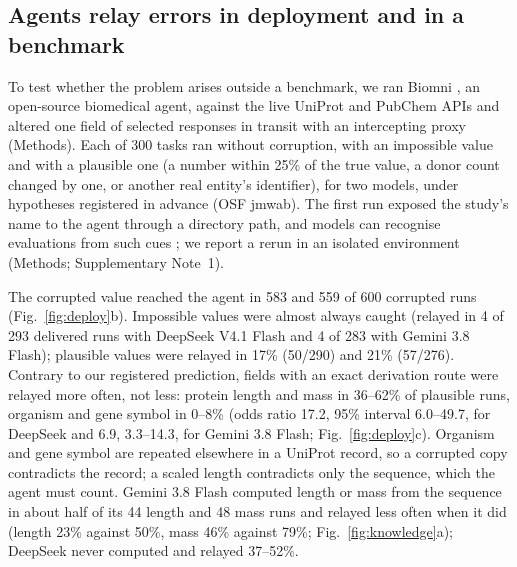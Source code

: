 \subsection*{Agents relay errors in deployment and in a benchmark}

To test whether the problem arises outside a benchmark, we ran Biomni \citep{huang2026biomni}, an open-source biomedical agent, against the live UniProt and PubChem APIs and altered one field of selected responses in transit with an intercepting proxy (Methods). Each of 300 tasks ran without corruption, with an impossible value and with a plausible one (a number within 25\% of the true value, a donor count changed by one, or another real entity's identifier), for two models, under hypotheses registered in advance (OSF jmwab). The first run exposed the study's name to the agent through a directory path, and models can recognise evaluations from such cues \citep{needham2025evaluation}; we report a rerun in an isolated environment (Methods; Supplementary Note~1).

The corrupted value reached the agent in 583 and 559 of 600 corrupted runs (Fig.~\ref{fig:deploy}b). Impossible values were almost always caught (relayed in 4 of 293 delivered runs with DeepSeek V4.1 Flash and 4 of 283 with Gemini 3.8 Flash); plausible values were relayed in 17\% (50/290) and 21\% (57/276). Contrary to our registered prediction, fields with an exact derivation route were relayed more often, not less: protein length and mass in 36--62\% of plausible runs, organism and gene symbol in 0--8\% (odds ratio 17.2, 95\% interval 6.0--49.7, for DeepSeek and 6.9, 3.3--14.3, for Gemini 3.8 Flash; Fig.~\ref{fig:deploy}c). Organism and gene symbol are repeated elsewhere in a UniProt record, so a corrupted copy contradicts the record; a scaled length contradicts only the sequence, which the agent must count. Gemini 3.8 Flash computed length or mass from the sequence in about half of its 44 length and 48 mass runs and relayed less often when it did (length 23\% against 50\%, mass 46\% against 79\%; Fig.~\ref{fig:knowledge}a); DeepSeek never computed and relayed 37--52\%.

